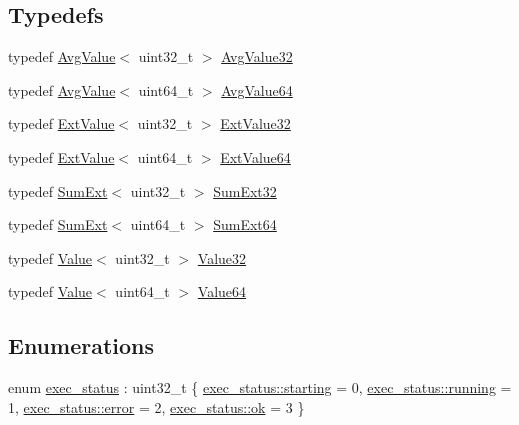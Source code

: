 \subsection*{Typedefs}
\begin{DoxyCompactItemize}
\item 
typedef \hyperlink{classxtd_1_1counters_1_1AvgValue}{Avg\+Value}$<$ uint32\+\_\+t $>$ \hyperlink{namespacextd_1_1counters_a162dd5cde0e6fcc970c543f7420b4c14}{Avg\+Value32}
\item 
typedef \hyperlink{classxtd_1_1counters_1_1AvgValue}{Avg\+Value}$<$ uint64\+\_\+t $>$ \hyperlink{namespacextd_1_1counters_aa43118623f65cdf1ba43bffd8f17ea0e}{Avg\+Value64}
\item 
typedef \hyperlink{classxtd_1_1counters_1_1ExtValue}{Ext\+Value}$<$ uint32\+\_\+t $>$ \hyperlink{namespacextd_1_1counters_ae049cff0f00adb1728a511d333c2aa50}{Ext\+Value32}
\item 
typedef \hyperlink{classxtd_1_1counters_1_1ExtValue}{Ext\+Value}$<$ uint64\+\_\+t $>$ \hyperlink{namespacextd_1_1counters_ad0d26d26ad71069f92a20b6d870e4872}{Ext\+Value64}
\item 
typedef \hyperlink{classxtd_1_1counters_1_1SumExt}{Sum\+Ext}$<$ uint32\+\_\+t $>$ \hyperlink{namespacextd_1_1counters_a7e0abdd1fae0f70421c2e0ea3924db6f}{Sum\+Ext32}
\item 
typedef \hyperlink{classxtd_1_1counters_1_1SumExt}{Sum\+Ext}$<$ uint64\+\_\+t $>$ \hyperlink{namespacextd_1_1counters_a268d063d4f32d16f65c388b8791602e3}{Sum\+Ext64}
\item 
typedef \hyperlink{classxtd_1_1counters_1_1Value}{Value}$<$ uint32\+\_\+t $>$ \hyperlink{namespacextd_1_1counters_ad10dfbcb762ad7dfc7199ab5a268bc6e}{Value32}
\item 
typedef \hyperlink{classxtd_1_1counters_1_1Value}{Value}$<$ uint64\+\_\+t $>$ \hyperlink{namespacextd_1_1counters_a20cdfbbbf5aa96abb1c5d461497d1769}{Value64}
\end{DoxyCompactItemize}
\subsection*{Enumerations}
\begin{DoxyCompactItemize}
\item 
enum \hyperlink{namespacextd_1_1counters_a408a8b2fd75b44228e1741ac4a32aff8}{exec\+\_\+status} \+: uint32\+\_\+t \{ \hyperlink{namespacextd_1_1counters_a408a8b2fd75b44228e1741ac4a32aff8a1ee85f6c60017a7f0646ba8dc5824de6}{exec\+\_\+status\+::starting} = 0, 
\hyperlink{namespacextd_1_1counters_a408a8b2fd75b44228e1741ac4a32aff8a75101dcdfc88455bcafc9e53e0b06689}{exec\+\_\+status\+::running} = 1, 
\hyperlink{namespacextd_1_1counters_a408a8b2fd75b44228e1741ac4a32aff8acb5e100e5a9a3e7f6d1fd97512215282}{exec\+\_\+status\+::error} = 2, 
\hyperlink{namespacextd_1_1counters_a408a8b2fd75b44228e1741ac4a32aff8a444bcb3a3fcf8389296c49467f27e1d6}{exec\+\_\+status\+::ok} = 3
 \}
\end{DoxyCompactItemize}


